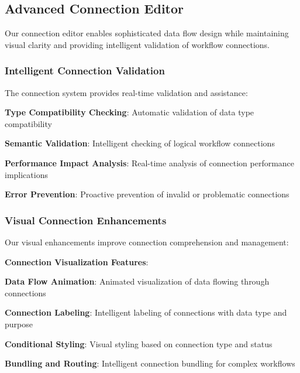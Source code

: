 \subsection*{Advanced Connection Editor}

Our connection editor enables sophisticated data flow design while maintaining visual clarity and providing intelligent validation of workflow connections.

\subsubsection*{Intelligent Connection Validation}

The connection system provides real-time validation and assistance:

\begin{compactlist}
    \item \textbf{Type Compatibility Checking}: Automatic validation of data type compatibility
    \item \textbf{Semantic Validation}: Intelligent checking of logical workflow connections
    \item \textbf{Performance Impact Analysis}: Real-time analysis of connection performance implications
    \item \textbf{Error Prevention}: Proactive prevention of invalid or problematic connections
\end{compactlist}

\subsubsection*{Visual Connection Enhancements}

Our visual enhancements improve connection comprehension and management:

\begin{successbox}
\textbf{Connection Visualization Features}:
\begin{compactlist}
    \item \textbf{Data Flow Animation}: Animated visualization of data flowing through connections
    \item \textbf{Connection Labeling}: Intelligent labeling of connections with data type and purpose
    \item \textbf{Conditional Styling}: Visual styling based on connection type and status
    \item \textbf{Bundling and Routing}: Intelligent connection bundling for complex workflows
\end{compactlist}
\end{successbox}


